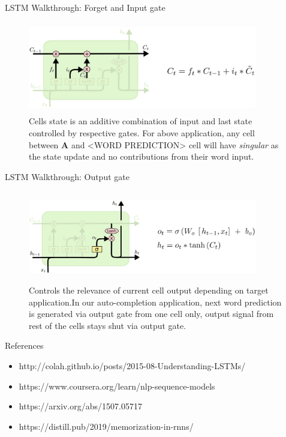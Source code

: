 \documentclass{beamer}
\begin{document}
\begin{frame}{LSTM Walkthrough: Forget and Input gate}
    \begin{center}
        \begin{figure}
            \centering
                \includegraphics[width=10cm, height=4cm]{images/lstm_cell_C_t_colah.png}
                \caption{Cells state is an additive combination of input and last state controlled by respective gates. For above application, any cell between \textbf{A} and \big<WORD PREDICTION\big> cell will have \textit{singular} as the state update and no contributions from their word input.}
        \end{figure}
        
    \end{center}
\end{frame}

\begin{frame}{LSTM Walkthrough: Output gate}
    \begin{center}
        \begin{figure}
            \centering
                \includegraphics[width=10cm, height=4cm]{images/lstm_cell_h_t_colah.png}   
                \caption{Controls the relevance of current cell output depending on target application.In our auto-completion application, next word prediction is generated via output gate from one cell only, output signal from rest of the cells stays shut via output gate.}
        \end{figure}        
    \end{center}
\end{frame}


\begin{frame}{References}
    \begin{itemize}
        \item http://colah.github.io/posts/2015-08-Understanding-LSTMs/
        \item https://www.coursera.org/learn/nlp-sequence-models
        \item https://arxiv.org/abs/1507.05717
        \item https://distill.pub/2019/memorization-in-rnns/
    \end{itemize}
\end{frame}
\end{document}
